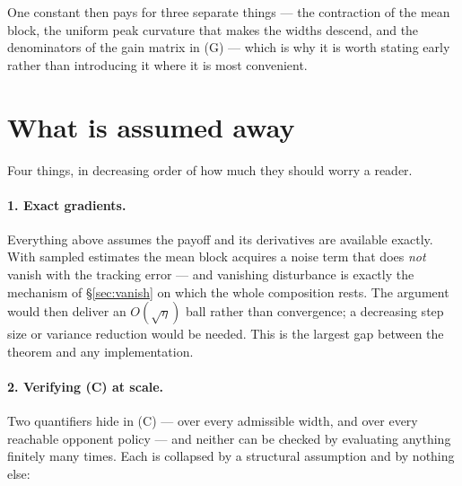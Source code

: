\documentclass[11pt]{article}
\theoremstyle{definition}
\begin{document}
One constant then pays for three separate things --- the contraction of the mean
block, the uniform peak curvature that makes the widths descend, and the
denominators of the gain matrix in (G) --- which is why it is worth stating
early rather than introducing it where it is most convenient.

\section{What is assumed away}\label{sec:gaps}

Four things, in decreasing order of how much they should worry a reader.

\paragraph{1. Exact gradients.} Everything above assumes the payoff and its
derivatives are available exactly. With sampled estimates the mean block acquires
a noise term that does \emph{not} vanish with the tracking error --- and vanishing
disturbance is exactly the mechanism of \S\ref{sec:vanish} on which the whole
composition rests. The argument would then deliver an $O(\sqrt\eta)$ ball rather
than convergence; a decreasing step size or variance reduction would be needed.
This is the largest gap between the theorem and any implementation.

\paragraph{2. Verifying (C) at scale.} Two quantifiers hide in (C) --- over every
admissible width, and over every reachable opponent policy --- and neither can be
checked by evaluating anything finitely many times. Each is collapsed by a
structural assumption and by nothing else:
\end{document}
